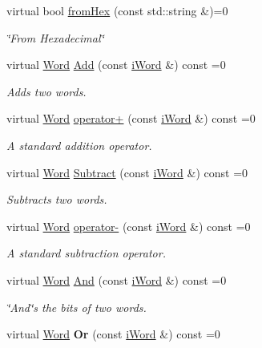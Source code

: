 \begin{DoxyCompactItemize}
virtual bool \hyperlink{classiWord_a0c08832b3e9b41073fc6666407ef8c53}{fromHex} (const std::string \&)=0
\begin{DoxyCompactList}\small\item\em \char`\"{}From Hexadecimal\char`\"{} \item\end{DoxyCompactList}\item 
virtual \hyperlink{classWord}{Word} \hyperlink{classiWord_a999c52ac2e7abf756eeb16fe5b31aad7}{Add} (const \hyperlink{classiWord}{iWord} \&) const =0
\begin{DoxyCompactList}\small\item\em Adds two words. \item\end{DoxyCompactList}\item 
virtual \hyperlink{classWord}{Word} \hyperlink{classiWord_a8dfb66b7cd91fe0a4169f071c1f9bc53}{operator+} (const \hyperlink{classiWord}{iWord} \&) const =0
\begin{DoxyCompactList}\small\item\em A standard addition operator. \item\end{DoxyCompactList}\item 
virtual \hyperlink{classWord}{Word} \hyperlink{classiWord_af69a5e10e094e3fc30fae0b651d95ea6}{Subtract} (const \hyperlink{classiWord}{iWord} \&) const =0
\begin{DoxyCompactList}\small\item\em Subtracts two words. \item\end{DoxyCompactList}\item 
virtual \hyperlink{classWord}{Word} \hyperlink{classiWord_a432fb05081debadb601d86cca05152c8}{operator-\/} (const \hyperlink{classiWord}{iWord} \&) const =0
\begin{DoxyCompactList}\small\item\em A standard subtraction operator. \item\end{DoxyCompactList}\item 
virtual \hyperlink{classWord}{Word} \hyperlink{classiWord_ae9f6bbc855712a208835d12cb3e40577}{And} (const \hyperlink{classiWord}{iWord} \&) const =0
\begin{DoxyCompactList}\small\item\em \char`\"{}And\char`\"{}s the bits of two words. \item\end{DoxyCompactList}\item 
\hypertarget{classiWord_a24a8821a44701deda1dd70972447172f}{
virtual \hyperlink{classWord}{Word} {\bfseries Or} (const \hyperlink{classiWord}{iWord} \&) const =0}
\label{classiWord_a24a8821a44701deda1dd70972447172f}


\end{DoxyCompactItemize}
